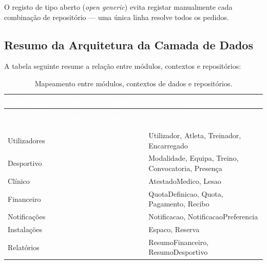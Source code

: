 O registo de tipo aberto (\textit{open generic}) evita registar manualmente cada combinação de repositório — uma única linha resolve todos os pedidos.

\subsection{Resumo da Arquitetura da Camada de Dados}

A tabela seguinte resume a relação entre módulos, contextos e repositórios:

\begin{center}
{\footnotesize
{}
\begin{xltabular}{\textwidth}{|>{\raggedright\arraybackslash}p{2cm}|>{\raggedright\arraybackslash}p{3.7cm}|>{\raggedright\arraybackslash}p{4.2cm}|>{\raggedright\arraybackslash}X|}
\hline
{}\textcolor{white}{\textbf{Módulo}} & \textcolor{white}{\textbf{DbContext}} & \textcolor{white}{\textbf{Repositório}} & \textcolor{white}{\textbf{Entidades}} \\ \hline
\endfirsthead

 \\
\hline
{}\textcolor{white}{\textbf{Módulo}} & \textcolor{white}{\textbf{DbContext}} & \textcolor{white}{\textbf{Repositório}} & \textcolor{white}{\textbf{Entidades}} \\ \hline
\endhead

\hline {} \\ \hline \endfoot

\hline
\caption{Mapeamento entre módulos, contextos de dados e repositórios.}
\label{tab:camada-dados} \\
\endlastfoot

Utilizadores  &          &                 & Utilizador, Atleta, Treinador, Encarregado \\ \hline
Desportivo    &         &            & Modalidade, Equipa, Treino, Convocatoria, Presença \\ \hline
Clínico       &       &          & AtestadoMedico, Lesao \\ \hline
Financeiro    &        &           & QuotaDefinicao, Quota, Pagamento, Recibo \\ \hline
Notificações  &  &     & Notificacao, NotificacaoPreferencia \\ \hline
Instalações   &     &        & Espaco, Reserva \\ \hline
Relatórios    &        &           & ResumoFinanceiro, ResumoDesportivo \\ \hline
\end{xltabular}
}
\end{center}

